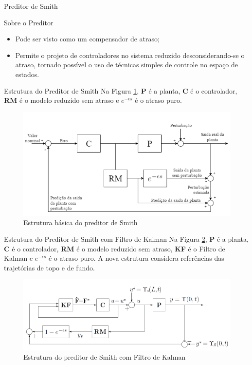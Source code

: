 \documentclass[10pt]{beamer}
\begin{document}
\begin{frame}[fragile]{Preditor de Smith}
\begin{block}{Sobre o Preditor}
\begin{itemize}
\item Pode ser visto como um compensador de atraso;
\item Permite o projeto de controladores no sistema reduzido desconsiderando-se o atraso, tornado possível o uso de técnicas simples de controle no espaço de estados.
\end{itemize}
\end{block}
\end{frame}

\begin{frame}[fragile]{Estrutura do Preditor de Smith}
Na Figura \ref{smithStruct1}, \textbf{P} é a planta, \textbf{C} é o controlador, \textbf{RM} é o modelo reduzido sem atraso e $e^{-\epsilon s}$ é o atraso puro.
\begin{figure}[!ht]
\centering
\includegraphics[width=.75\linewidth]{figures/smith/smith1}
\caption{Estrutura básica do preditor de Smith \cite{rafaelMestrado}}
\label{smithStruct1}
\end{figure}
\end{frame}

\begin{frame}[fragile]{Estrutura do Preditor de Smith com Filtro de Kalman}
Na Figura \ref{smithStruct2}, \textbf{P} é a planta, \textbf{C} é o controlador, \textbf{RM} é o modelo reduzido sem atraso, \textbf{KF} é o Filtro de Kalman e $e^{-\epsilon s}$ é o atraso puro. A nova estrutura considera referências das trajetórias de topo e de fundo.
\begin{figure}[!ht]
\centering
\includegraphics[width=.85\linewidth]{figures/smith/smith2}
\caption{Estrutura do preditor de Smith com Filtro de Kalman \cite{rafaelMestrado}}
\label{smithStruct2}
\end{figure}
\end{frame}
\end{document}
